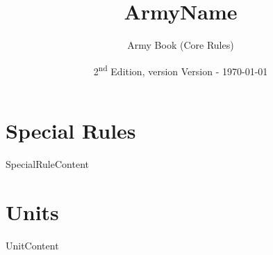 \documentclass[12pt]{article}
\begin{document}
\title{ {{ArmyName}} }
\author{Army Book (Core Rules)}
\date{2\textsuperscript{nd} Edition, version \the\year{} {{Version}} - \today}
\maketitle
\tableofcontents

\section{Special Rules}
{{SpecialRuleContent}}

\section{Units}
{{UnitContent}}
\end{document}
